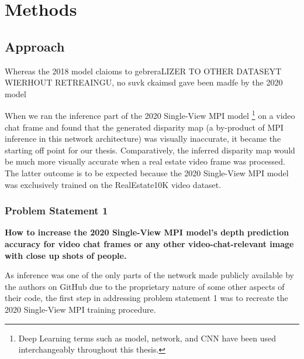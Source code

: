 \chapter{Methods}\label{ch2:methods}

\section{Approach}\label{sec1:approach} 

Whereas the 2018 model claioms to gebreraLIZER TO OTHER DATASEYT WIERHOUT RETREAINGU, no suvk ckaimsd gave been madfe by the 2020 model

When we ran the inference part of the 2020 Single-View MPI model \footnote{Deep Learning terms such as model, network, and CNN have been used interchangeably throughout this thesis.} on a video chat frame and found that the generated disparity map (a by-product of MPI inference in this network architecture) was visually inaccurate, it became the starting off point for our thesis. Comparatively, the inferred disparity map would be much more visually accurate when a real estate video frame was processed. The latter outcome is to be expected because the 2020 Single-View MPI model was exclusively trained on the RealEstate10K video dataset.   

\subsection{Problem Statement 1}\label{subsec1:problem_statement_1}

\textbf{How to increase the 2020 Single-View MPI model’s depth prediction accuracy for video chat frames or any other video-chat-relevant image with close up shots of people.}

As inference was one of the only parts of the network made publicly available by the authors on GitHub due to the proprietary nature of some other aspects of their code, the first step in addressing problem statement 1 was to recreate the 2020 Single-View MPI training procedure.

